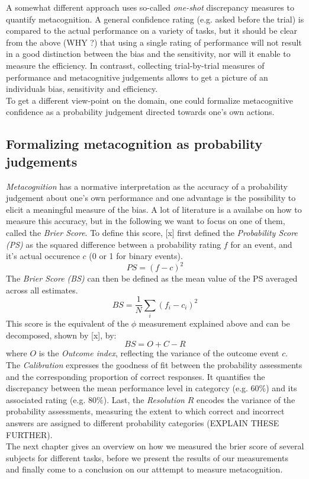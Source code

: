 \documentclass[../main/main.tex]{subfiles}
\begin{document}
	A somewhat different approach uses so-called \textit{one-shot} discrepancy measures to quantify metacognition. A general confidence rating (e.g. asked before the trial) is compared to the actual performance on a variety of tasks, but it should be clear from the above (WHY ?) that using a single rating of performance will not result in a good distinction between the bias and the sensitivity, nor will it enable to measure the efficiency. In contrasst, collecting trial-by-trial measures of performance and metacognitive judgements allows to get a picture of an individuals bias, sensitivity and efficiency.\\
	To get a different view-point on the domain, one could formalize metacognitive confidence as a probability judgement directed towards one's own actions.
	
	\newpage
	\subsection{Formalizing metacognition as probability judgements}
	
	\textit{Metacognition} has a normative interpretation as the accuracy of a probability judgement about one's own performance and one advantage is the possibility to elicit a meaningful measure of the bias. A lot of literature is a availabe on how to measure this accuracy, but in the following we want to focus on one of them, called the \textit{Brier Score}. To define this score, [x] first defined the \textit{Probability Score (PS)} as the squared difference between a probability rating $f$ for an event, and it's actual occurence $c$ (0 or 1 for binary events).
	\begin{displaymath}
			PS = (f - c)^2
	\end{displaymath}
	The \textit{Brier Score (BS)} can then be defined as the mean value of the PS averaged across all estimates. 
	\begin{displaymath}
			BS = \frac{1}{N}\sum_i(f_i - c_i)^2
	\end{displaymath}
	This score is the equivalent of the $\phi$ measurement explained above and can be decomposed, shown by [x], by:
	\begin{displaymath}
		BS = O + C - R
	\end{displaymath}
	where $O$ is the \textit{Outcome index}, reflecting the variance of the outcome event $c$. The \textit{Calibration} expresses the goodness of fit between the probability assessments and the corresponding proportion of correct responses. It quantifies the discrepancy between the mean performance level in categorcy (e.g. $60\%$) and its associated rating (e.g. $80\%$). Last, the \textit{Resolution} $R$ encodes the variance of the probability assessments, measuring the extent to which correct and incorrect answers are assigned to different probability categories (EXPLAIN THESE FURTHER).\\
	The next chapter gives an overview on how we measured the brier score of several subjects for different tasks, before we present the results of our measurements and finally come to a conclusion on our atttempt to measure metacognition.
	
\end{document}
